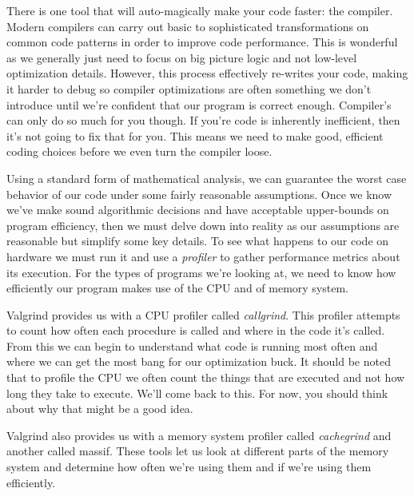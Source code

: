 \documentclass[]{tufte-handout}
\begin{document}
There is one tool that will auto-magically make your code faster: the compiler.  Modern compilers can carry out basic to sophisticated transformations on common code patterns in order to improve code performance.  This is wonderful as we generally just need to focus on big picture logic and not low-level optimization details. However, this process effectively re-writes your code, making it harder to debug so compiler optimizations are often something we don't introduce until we're confident that our program is correct enough.  Compiler's can only do so much for you though. If you're code is inherently inefficient, then it's not going to fix that for you.  This means we need to make good, efficient coding choices before we even turn the compiler loose.   

Using a standard form of mathematical analysis, we can guarantee the worst case behavior of our code under some fairly reasonable assumptions. Once we know we've make sound algorithmic decisions and have acceptable upper-bounds on program efficiency, then we must delve down into reality as our assumptions are reasonable but simplify some key details. To see what happens to our code on hardware we must run it and use a \textit{profiler} to gather performance metrics about its execution.  For the types of programs we're looking at, we need to know how efficiently our program makes use of the CPU and of memory system.

Valgrind provides us with a CPU profiler called \textit{callgrind}. This profiler attempts to count how often each procedure is called and where in the code it's called.  From this we can begin to understand what code is running most often and where we can get the most bang for our optimization buck.  It should be noted that to profile the CPU we often count the things that are executed and not how long they take to execute.  We'll come back to this. For now, you should think about why that might be a good idea.  

Valgrind also provides us with a memory system profiler called \textit{cachegrind} and another called {massif}.  These tools let us look at different parts of the memory system and determine how often we're using them and if we're using them efficiently.       
\end{document}
